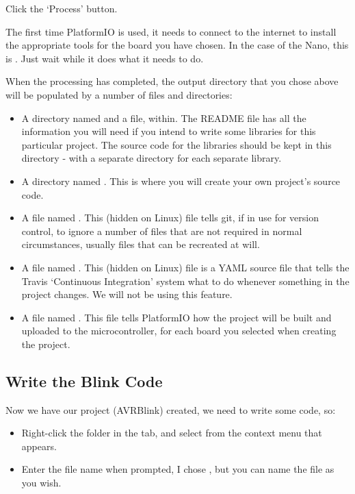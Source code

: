 Click the `Process' button.

The first time PlatformIO is used, it needs to connect to the internet
to install the appropriate tools for the board you have chosen. In the
case of the Nano, this is . Just wait while it does what it needs to do.

When the processing has completed, the output directory that you chose
above will be populated by a number of files and directories:

\begin{itemize}
\item
  A directory named  and a file,  within.
  The README file has all the information you will need if you intend to
  write some libraries for this particular project. The source code for
  the libraries should be kept in this directory - with a separate directory for each separate library.
\item
  A directory named . This is where you will create your own
  project's source code.
\item
  A file named . This (hidden on Linux) file tells git, if in use for
  version control, to ignore a number of files that are not required in
  normal circumstances, usually files that can be recreated at will.
\item
  A file named . This (hidden on Linux) file is a YAML source file that
  tells the Travis `Continuous Integration' system what to do whenever
  something in the project changes. We will not be using this feature.
\item
  A file named . This file tells PlatformIO how the
  project will be built and uploaded to the microcontroller, for each
  board you selected when creating the project.
\end{itemize}

\subsection{Write the Blink Code}\label{write-the-blink-code}

Now we have our project (AVRBlink) created, we need to write some code, so:

\begin{itemize}
\item
  Right-click the  folder in the  tab, and select
   from the context menu that appears.
\item
  Enter the file name when prompted, I chose , but you can name
  the file as you wish.
\end{itemize}

